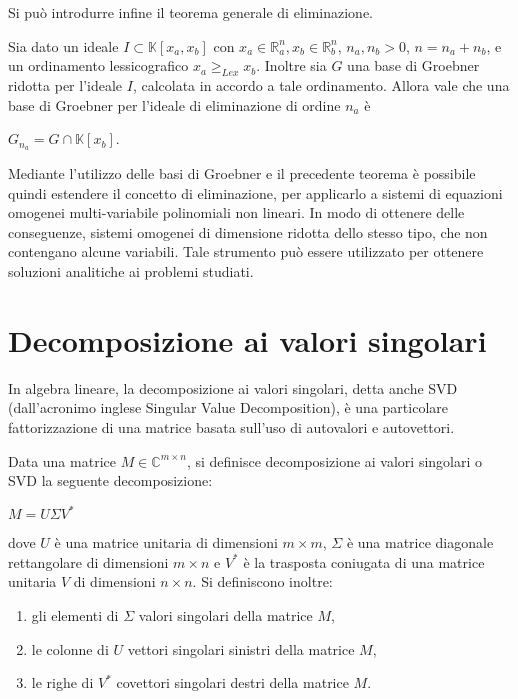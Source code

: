 Si può introdurre infine il teorema generale di eliminazione.
\begin{teor}
	\label{teo:elimination}
	Sia dato un ideale $I \subset \mathbb{K}[x_a, x_b]$ con $x_a \in \mathbb{R}^n_a, x_b \in \mathbb{R}^n_b$, $ n_a, n_b > 0$, $n = n_a + n_b$, e un ordinamento lessicografico $x_a \ge_{Lex} x_b$. Inoltre sia $G$ una base di Groebner ridotta per l'ideale $I$, calcolata in accordo a tale ordinamento. Allora vale che una base di Groebner per l'ideale di eliminazione di ordine $n_a$ è 
	\begin{center}
		$G_{n_a} = G \cap \mathbb{K}[x_b]$.
	\end{center}
\end{teor}

Mediante l'utilizzo delle basi di Groebner e il precedente teorema è possibile quindi estendere il concetto di eliminazione, per applicarlo a sistemi di equazioni omogenei multi-variabile polinomiali non lineari. In modo di ottenere delle conseguenze, sistemi omogenei di dimensione ridotta dello stesso tipo, che non contengano alcune variabili. Tale strumento può essere utilizzato per ottenere soluzioni analitiche ai problemi studiati. 

\section{Decomposizione ai valori singolari}
\label{sec:SVD}

In algebra lineare, la decomposizione ai valori singolari, detta anche SVD (dall'acronimo inglese Singular Value Decomposition), è una particolare fattorizzazione di una matrice basata sull'uso di autovalori e autovettori. 

\begin{defn}
	Data una matrice $M \in \mathbb{C}^{m \times n}$, si definisce decomposizione ai valori singolari o SVD la seguente decomposizione:
	\begin{center}
		$M = U \Sigma V^*$
	\end{center}
	dove $U$ è una matrice unitaria di dimensioni  $m\times m$, $\Sigma$ è una matrice diagonale rettangolare di dimensioni $m\times n$ e $V^*$ è la trasposta coniugata di una matrice unitaria $V$ di dimensioni $n\times n$.
	Si definiscono inoltre:
	\begin{enumerate}
		\item gli elementi di $\Sigma$ valori singolari della matrice $M$,
		\item le colonne di $U$ vettori singolari sinistri della matrice $M$,
		\item le righe di $V^*$ covettori singolari destri  della matrice $M$.		
	\end{enumerate}
\end{defn}

